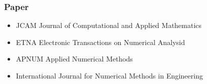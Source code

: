 \documentclass{beamer}
\begin{document}
\begin{frame}[shrink=10]
\frametitle{Paper}



\begin{itemize}
 \item JCAM Journal of Computational and Applied Mathematics
 \item ETNA Electronic Transactions on Numerical Analysid
 \item APNUM Applied Numerical Methods
 \item International Journal for Numerical Methods in Engineering
\end{itemize}


\end{frame}
\end{document}
